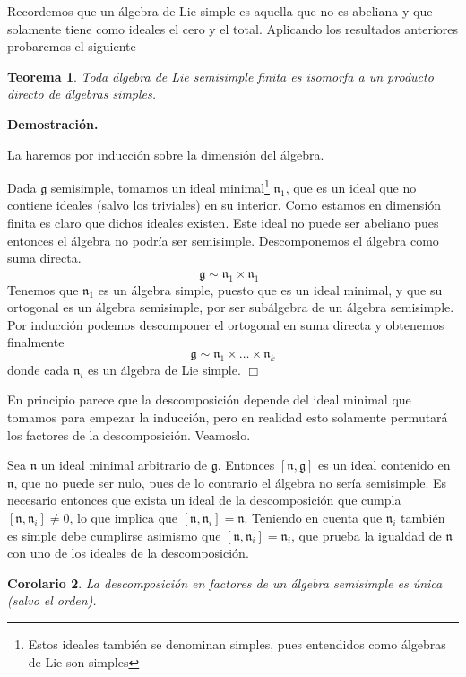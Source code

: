 \documentclass[a4paper,draft,12pt]{article}
\newtheorem{teo}{Teorema}[section]%
\newtheorem{cor}[teo]{Corolario}%
\newcommand{\dem}{\noindent \textbf{Demostración. }\vspace{0.3 cm}}%
\newcommand{\g}{\mathfrak{g}}%
\newcommand{\fin}{ $\Box $ \vspace{0.4 cm}}
\begin{document}
Recordemos que un álgebra de Lie simple es aquella que no es abeliana y que solamente tiene como ideales el cero y el total.  Aplicando los resultados anteriores probaremos el siguiente

\begin{teo}

Toda álgebra de Lie semisimple finita es isomorfa a un producto directo de álgebras simples.

\end{teo}

\dem

La haremos por inducción sobre la dimensión del álgebra.

Dada $\g$ semisimple, tomamos un ideal minimal\footnote{Estos ideales también se denominan simples, pues entendidos como álgebras de Lie son simples} $\mathfrak{n}_1$, que es un ideal que no contiene ideales (salvo los triviales) en su interior.  Como estamos en dimensión finita es claro que dichos ideales existen.  Este ideal no puede ser abeliano pues entonces el álgebra no podría ser semisimple.  Descomponemos el álgebra como suma directa.
$$
\g \sim \mathfrak{n}_1 \times {\mathfrak{n}_1}^\perp
$$
Tenemos que $\mathfrak{n}_1$ es un álgebra simple, puesto que es un ideal minimal,  y que su ortogonal es un álgebra semisimple, por ser subálgebra de un álgebra semisimple.  Por inducción podemos descomponer el ortogonal en suma directa y obtenemos finalmente
$$
\g \sim \mathfrak{n}_1 \times \dots \times  \mathfrak{n}_k
$$
donde cada $\mathfrak{n}_i$ es un álgebra de Lie simple.  \fin

En principio parece que la descomposición depende del ideal minimal que tomamos para empezar la inducción, pero en realidad esto solamente permutará los factores de la descomposición.  Veamoslo.

Sea $\mathfrak{n}$ un ideal minimal arbitrario de $\g$.  Entonces $[\mathfrak{n}, \g]$ es un ideal contenido en $\mathfrak{n}$, que no puede ser nulo, pues de lo contrario el álgebra no sería semisimple.  Es necesario entonces que exista  un ideal de la descomposición que cumpla $[\mathfrak{n},\mathfrak{n}_i]\neq 0$, lo que implica que $[\mathfrak{n},\mathfrak{n}_i]= \mathfrak{n}$. Teniendo en cuenta que $\mathfrak{n}_i$ también es simple debe cumplirse asimismo que $[\mathfrak{n},\mathfrak{n}_i]= \mathfrak{n}_i$, que prueba la igualdad de $\mathfrak{n}$ con uno de los ideales de la descomposición.

\begin{cor}

La descomposición en factores de un álgebra semisimple es úni\-ca (salvo el orden).

\end{cor}
\end{document}
